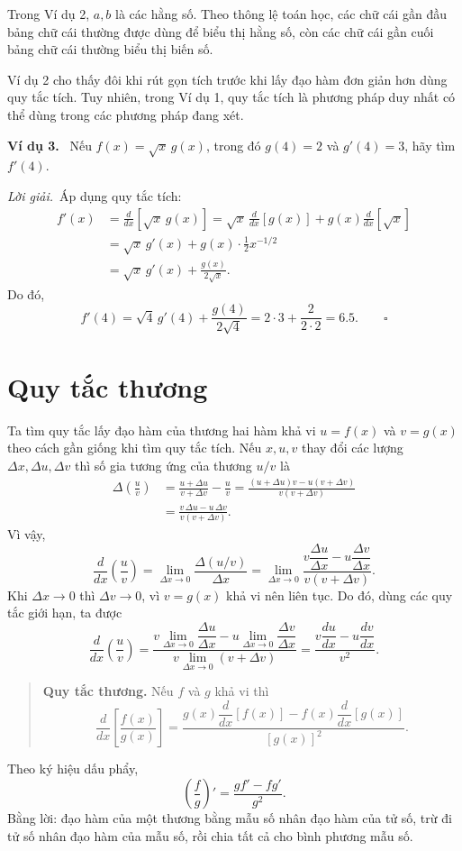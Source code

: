 \documentclass[12pt,a4paper]{article}
\newcommand{\ex}[1]{\par\medskip\noindent\textbf{Ví dụ #1.}\ }
\newcommand{\sol}{\par\nopagebreak[4]\noindent\textit{Lời giải.}\ }
\begin{document}
Trong Ví dụ 2, $a,b$ là các hằng số. Theo thông lệ toán học, các chữ cái gần đầu bảng chữ cái thường được dùng để biểu thị hằng số, còn các chữ cái gần cuối bảng chữ cái thường biểu thị biến số.

Ví dụ 2 cho thấy đôi khi rút gọn tích trước khi lấy đạo hàm đơn giản hơn dùng quy tắc tích. Tuy nhiên, trong Ví dụ 1, quy tắc tích là phương pháp duy nhất có thể dùng trong các phương pháp đang xét.
\ex{3} Nếu $f(x)=\sqrt{x}\,g(x)$, trong đó $g(4)=2$ và $g'(4)=3$, hãy tìm $f'(4)$.
\sol Áp dụng quy tắc tích:
\begin{align*}
f'(x)&=\frac{d}{dx}[\sqrt{x}\,g(x)]
=\sqrt{x}\,\frac{d}{dx}[g(x)]+g(x)\frac{d}{dx}[\sqrt{x}]\\
&=\sqrt{x}\,g'(x)+g(x)\cdot\frac12x^{-1/2}\\
&=\sqrt{x}\,g'(x)+\frac{g(x)}{2\sqrt{x}}.
\end{align*}
Do đó,
\[f'(4)=\sqrt4\,g'(4)+\frac{g(4)}{2\sqrt4}=2\cdot3+\frac2{2\cdot2}=6.5.\qquad\square\]
\section*{Quy tắc thương}
Ta tìm quy tắc lấy đạo hàm của thương hai hàm khả vi $u=f(x)$ và $v=g(x)$ theo cách gần giống khi tìm quy tắc tích. Nếu $x,u,v$ thay đổi các lượng $\Delta x,\Delta u,\Delta v$ thì số gia tương ứng của thương $u/v$ là
\begin{align*}
\Delta\left(\frac uv\right)&=\frac{u+\Delta u}{v+\Delta v}-\frac uv
=\frac{(u+\Delta u)v-u(v+\Delta v)}{v(v+\Delta v)}\\
&=\frac{v\,\Delta u-u\,\Delta v}{v(v+\Delta v)}.
\end{align*}
Vì vậy,
\[\frac{d}{dx}\left(\frac uv\right)=\lim_{\Delta x\to0}\frac{\Delta(u/v)}{\Delta x}
=\lim_{\Delta x\to0}\frac{v\dfrac{\Delta u}{\Delta x}-u\dfrac{\Delta v}{\Delta x}}{v(v+\Delta v)}.\]
Khi $\Delta x\to0$ thì $\Delta v\to0$, vì $v=g(x)$ khả vi nên liên tục. Do đó, dùng các quy tắc giới hạn, ta được
\[\frac{d}{dx}\left(\frac uv\right)
=\frac{v\displaystyle\lim_{\Delta x\to0}\dfrac{\Delta u}{\Delta x}-u\displaystyle\lim_{\Delta x\to0}\dfrac{\Delta v}{\Delta x}}{v\displaystyle\lim_{\Delta x\to0}(v+\Delta v)}
=\frac{v\dfrac{du}{dx}-u\dfrac{dv}{dx}}{v^2}.\]
\begin{quote}\textbf{Quy tắc thương.} Nếu $f$ và $g$ khả vi thì
\[\frac{d}{dx}\left[\frac{f(x)}{g(x)}\right]
=\frac{g(x)\dfrac{d}{dx}[f(x)]-f(x)\dfrac{d}{dx}[g(x)]}{[g(x)]^2}.\]
\end{quote}
Theo ký hiệu dấu phẩy,
\[\left(\frac fg\right)'=\frac{gf'-fg'}{g^2}.\]
Bằng lời: đạo hàm của một thương bằng mẫu số nhân đạo hàm của tử số, trừ đi tử số nhân đạo hàm của mẫu số, rồi chia tất cả cho bình phương mẫu số.
\end{document}
